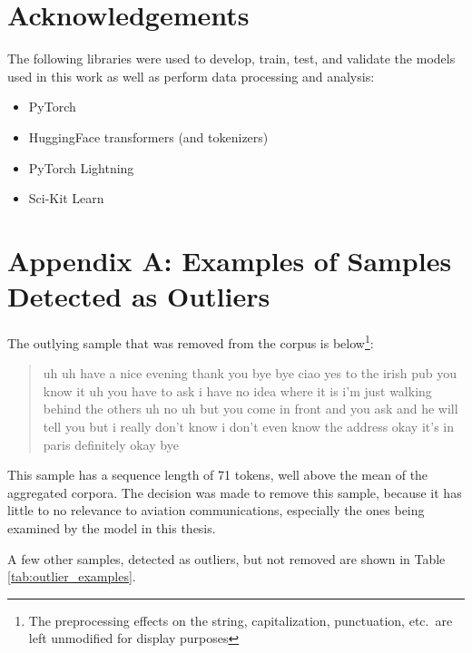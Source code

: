 \documentclass[12pt]{article}
\begin{document}
\newpage
\section{Acknowledgements}
The following libraries were used to develop, train, test, and validate the models used in this work as well as perform data processing and analysis:
\begin{itemize}
    \item PyTorch \cite{paszke_pytorch_2019}
    \item HuggingFace transformers (and tokenizers) \cite{wolf_transformers_2020}
    \item PyTorch Lightning \cite{falcon_pytorchlightning_2019}
    \item Sci-Kit Learn \cite{pedregosa_scikit-learn_2011}
\end{itemize}

\newpage
\section{Appendix A: Examples of Samples Detected as Outliers}
The outlying sample that was removed from the corpus is below\footnote{The preprocessing effects on the string, capitalization, punctuation, etc.~are left
    unmodified for display purposes}:

\begin{quote}
    uh uh have a nice evening thank you bye bye ciao yes to the irish pub you know it uh you have to ask i have no idea where it is i'm just walking
    behind the others uh no uh but you come in front and you ask and he will tell you but i really don't know i don't even know the address okay it's
    in paris definitely okay bye
\end{quote}

This sample has a sequence length of 71 tokens, well above the mean of the aggregated corpora. The decision was made to remove this sample, because
it has little to no relevance to aviation communications, especially the ones being examined by the model in this thesis.

A few other samples, detected as outliers, but not removed are shown in Table \ref{tab:outlier_examples}.
\end{document}
